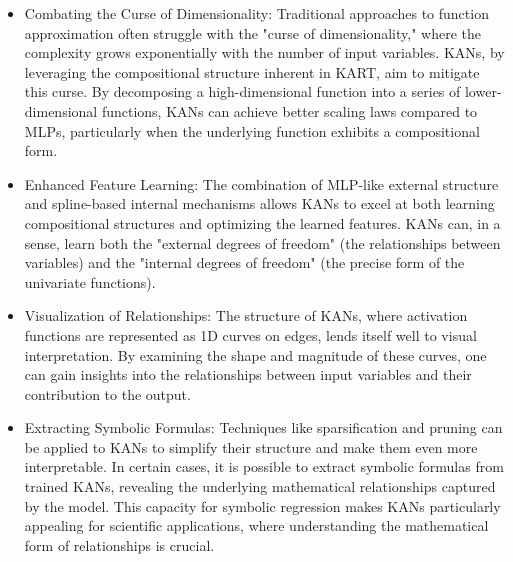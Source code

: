 \begin{itemize}
    \item Combating the Curse of Dimensionality: Traditional approaches to function approximation often struggle with the "curse of dimensionality," where the complexity grows exponentially with the number of input variables. KANs, by leveraging the compositional structure inherent in KART, aim to mitigate this curse. By decomposing a high-dimensional function into a series of lower-dimensional functions, KANs can achieve better scaling laws compared to MLPs, particularly when the underlying function exhibits a compositional form.
    \item Enhanced Feature Learning: The combination of MLP-like external structure and spline-based internal mechanisms allows KANs to excel at both learning compositional structures and optimizing the learned features. KANs can, in a sense, learn both the "external degrees of freedom" (the relationships between variables) and the "internal degrees of freedom" (the precise form of the univariate functions).
    \item Visualization of Relationships: The structure of KANs, where activation functions are represented as 1D curves on edges, lends itself well to visual interpretation. By examining the shape and magnitude of these curves, one can gain insights into the relationships between input variables and their contribution to the output.
    \item Extracting Symbolic Formulas: Techniques like sparsification and pruning can be applied to KANs to simplify their structure and make them even more interpretable. In certain cases, it is possible to extract symbolic formulas from trained KANs, revealing the underlying mathematical relationships captured by the model. This capacity for symbolic regression makes KANs particularly appealing for scientific applications, where understanding the mathematical form of relationships is crucial.
\end{itemize}
